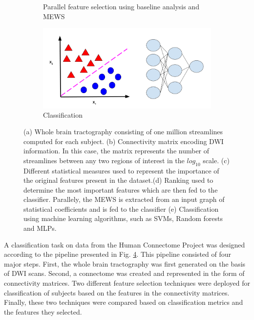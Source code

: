 \documentclass[msthesis.tex]{subfiles}
\begin{document}
\begin{figure}
\begin{subfigure}[b]{0.9\textwidth}
\begin{subfigure}[b]{0.4\textwidth}
         \label{fig:mewspip}
         \end{subfigure}
    \vspace{-2em}
     \caption{Parallel feature selection using baseline analysis and MEWS}
    \end{subfigure}
    \vfill
        \begin{subfigure}[b]{0.6\textwidth}
         \centering
         \includegraphics[height =0.4\textwidth,width=\textwidth]{images/classification.png}
         \caption{Classification}
         \label{fig:three sin x}
         \end{subfigure}
    \caption{(a) Whole brain tractography consisting of one million streamlines computed for each subject. (b) Connectivity matrix encoding DWI information. In this case, the matrix represents the number of streamlines between any two regions of interest in the $log_{10}$ scale. (c) Different statistical measures used to represent the importance of the original features present in the dataset.(d) Ranking used to determine the  most important features which are then fed to the classifier. Parallely, the MEWS is extracted from an input graph of statistical coefficients and is fed to the classifier (e) Classification using machine learning algorithms, such as SVMs, Random forests and MLPs.}    
    \label{fig:pipeline}
\end{figure}

A classification task on data from the Human Connectome Project was designed according to the pipeline presented in Fig. \ref{fig:pipeline}.  This pipeline consisted of four major steps. First, the whole brain tractography was first generated on the basis of DWI scans. Second,  a connectome was created and represented in the form of connectivity matrices. Two different feature selection techniques were deployed for classification of subjects based on the features in the connectivity matrices. Finally, these two techniques were compared based on classification metrics and the features they selected. 
\end{document}
